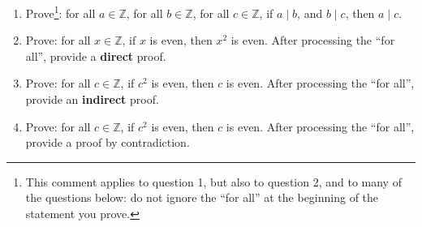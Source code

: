 \documentclass{article}
\begin{document}
\begin{enumerate}
            \newpage

      \item Prove\footnote{This comment applies to question 1, but also to question 2, and
                  to many of the questions below: do not ignore the ``for all'' at the beginning
                  of the statement you prove.}: for all $a \in \mathbb{Z}$, for all $b \in
                  \mathbb{Z}$, for all $c \in \mathbb{Z}$, if $a \mid b$, and $b \mid c$, then $a
                  \mid c$. \newpage

      \item Prove: for all $x \in \mathbb{Z}$, if $x$ is even, then $x^2$ is even. After
            processing the ``for all'', provide a {\bf direct} proof.

            \newpage

      \item Prove: for all $c \in \mathbb{Z}$, if $c^2$ is even, then $c$ is even. After
            processing the ``for all'', provide an {\bf indirect} proof.

            \newpage

      \item Prove: for all $c \in \mathbb{Z}$, if $c^2$ is even, then $c$ is even. After
            processing the ``for all'', provide a proof by contradiction.

\end{enumerate}
\end{document}
